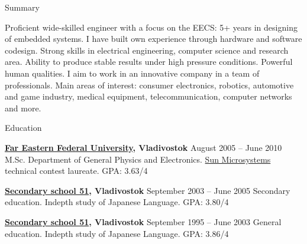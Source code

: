 \documentclass{template}
\begin{document}

\begin{rSection}{Summary}

Proficient wide-skilled engineer with a focus on the EECS: 5+ years in designing of embedded systems. I have built own experience
through hardware and software codesign. Strong skills in electrical engineering, computer science and research area.  Ability to
produce stable results under high pressure conditions. Powerful human qualities. I aim to work in an innovative company in a team
of professionals. Main areas of interest: consumer electronics, robotics, automotive and game industry, medical equipment,
telecommunication, computer networks and more.

\end{rSection}


\begin{rSection}{Education}

{\bf \href{http://wwwold.dvfu.ru/en/web/fefu/}{Far Eastern Federal University}, Vladivostok} \hfill {August 2005 -- June 2010} \newline
M.Sc. Department of General Physics and Electronics. \newline
\href{http://www.oracle.com}{Sun Microsystems} technical contest laureate. \newline
GPA: 3.63/4

{\bf \href{ http://www.school51.pupils.ru }{Secondary school 51}, Vladivostok} \hfill {September 2003 -- June 2005} \newline
Secondary education. \newline
Indepth study of Japanese Language. \newline
GPA: 3.80/4

{\bf \href{http://www.school51.pupils.ru}{Secondary school 51}, Vladivostok} \hfill {September 1995 -- June 2003} \newline
General education. \newline
Indepth study of Japanese Language. \newline
GPA: 3.86/4

\end{rSection}

\end{document}
